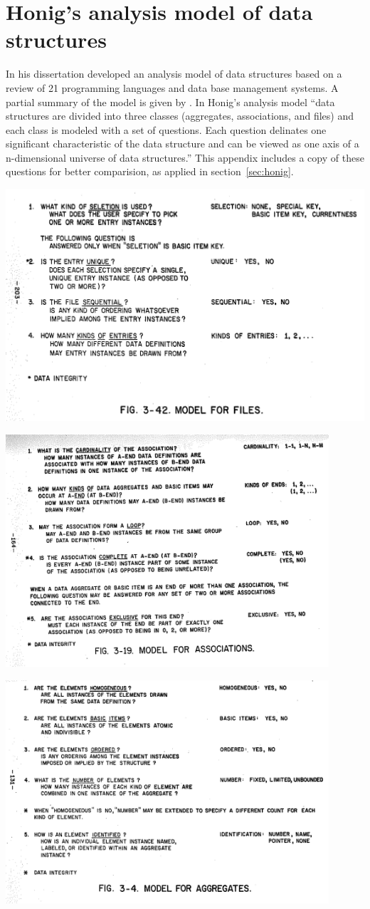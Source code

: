 \section{Honig's analysis model of data structures}
\label{appendixA}

In his dissertation \textcite{Honig1975} developed an analysis model of data
structures based on a review of 21 programming languages and data base
management systems.  A partial summary of the model is given by
\textcite{Honig1978}.  In Honig's analysis model ``data structures are divided
into three classes (aggregates, associations, and files) and each class is
modeled with a set of questions. Each question delinates one significant
characteristic of the data structure and can be viewed as one axis of a
n-dimensional universe of data structures.'' This appendix includes a copy of
these questions for better comparision, as applied in
section~\ref{sec:honig}.

\includegraphics[width=\textwidth]{img/honig1975fig3-42.png}

\thispagestyle{empty}
\includegraphics[width=0.9\textwidth]{img/honig1975fig3-19.png}

\includegraphics[width=0.9\textwidth]{img/honig1975fig3-4.png}
